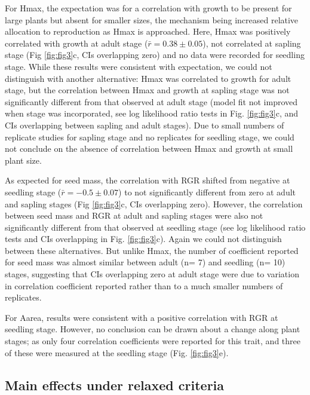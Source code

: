 \documentclass[a4paper,11pt]{article}
\begin{document}
For Hmax, the expectation was for a correlation with growth to be present for large plants but absent for smaller sizes, the mechanism being increased relative allocation to reproduction as Hmax is approached. Here, Hmax was positively correlated with growth at adult stage ($\bar{r}= 0.38 \pm 0.05$), not correlated at sapling stage (Fig \ref{fig:fig3}c, CIs overlapping zero) and no data were recorded for seedling stage. 
While these results were consistent with expectation, we could not distinguish with another alternative: Hmax was correlated to growth for adult stage, but the correlation between Hmax and growth at sapling stage was not significantly different from that observed at adult stage (model fit not improved when stage was incorporated, see log likelihood ratio tests in Fig. \ref{fig:fig3}c, and CIs overlapping between sapling and adult stages). Due to small numbers of replicate studies for sapling stage and no replicates for seedling stage, we could not conclude on the absence of correlation between Hmax and growth at small plant size.

As expected for seed mass, the correlation with RGR shifted from negative at seedling stage ($\bar{r}= -0.5 \pm 0.07$) to not significantly different from zero at adult and sapling stages (Fig \ref{fig:fig3}c, CIs overlapping zero). However, the correlation between seed mass and RGR at adult and sapling stages were also not significantly different from that observed at seedling stage (see log likelihood ratio tests and CIs overlapping in Fig. \ref{fig:fig3}c). Again we could not distinguish between these alternatives. But unlike Hmax, the number of coefficient reported for seed mass was almost similar between adult (n= 7) and seedling (n= 10) stages, suggesting that CIs overlapping zero at adult stage were due to variation in correlation coefficient reported rather than to a much smaller numbers of replicates.

For Aarea, results were consistent with a positive correlation with RGR at seedling stage. However, no conclusion can be drawn about a change along plant stages; as only four correlation coefficients were reported for this trait, and three of these were measured at the seedling stage (Fig. \ref{fig:fig3}e).


\subsection*{Main effects under relaxed criteria}
\end{document}
